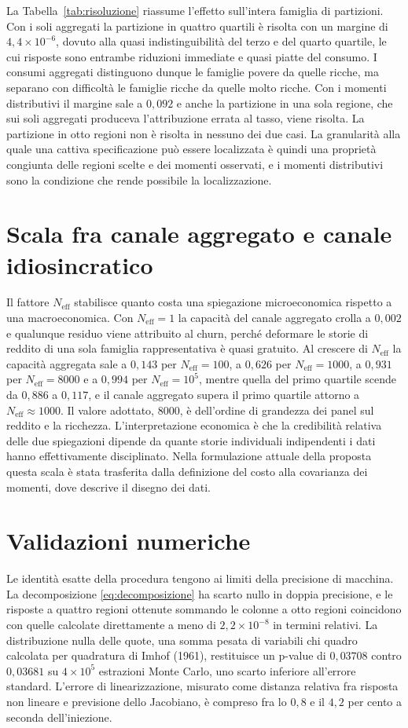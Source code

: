 \documentclass[11pt,a4paper]{article}
\newcommand{\Neff}{N_{\mathrm{eff}}}
\begin{document}
La Tabella~\ref{tab:risoluzione} riassume l'effetto sull'intera famiglia di partizioni. Con i soli aggregati la partizione in quattro quartili è risolta con un margine di $4{,}4\times10^{-6}$, dovuto alla quasi indistinguibilità del terzo e del quarto quartile, le cui risposte sono entrambe riduzioni immediate e quasi piatte del consumo. I consumi aggregati distinguono dunque le famiglie povere da quelle ricche, ma separano con difficoltà le famiglie ricche da quelle molto ricche. Con i momenti distributivi il margine sale a $0{,}092$ e anche la partizione in una sola regione, che sui soli aggregati produceva l'attribuzione errata al tasso, viene risolta. La partizione in otto regioni non è risolta in nessuno dei due casi. La granularità alla quale una cattiva specificazione può essere localizzata è quindi una proprietà congiunta delle regioni scelte e dei momenti osservati, e i momenti distributivi sono la condizione che rende possibile la localizzazione.

\section{Scala fra canale aggregato e canale idiosincratico}\label{sec:neff}
Il fattore $\Neff$ stabilisce quanto costa una spiegazione microeconomica rispetto a una macroeconomica. Con $\Neff=1$ la capacità del canale aggregato crolla a $0{,}002$ e qualunque residuo viene attribuito al churn, perché deformare le storie di reddito di una sola famiglia rappresentativa è quasi gratuito. Al crescere di $\Neff$ la capacità aggregata sale a $0{,}143$ per $\Neff=100$, a $0{,}626$ per $\Neff=1000$, a $0{,}931$ per $\Neff=8000$ e a $0{,}994$ per $\Neff=10^5$, mentre quella del primo quartile scende da $0{,}886$ a $0{,}117$, e il canale aggregato supera il primo quartile attorno a $\Neff\approx1000$. Il valore adottato, $8000$, è dell'ordine di grandezza dei panel sul reddito e la ricchezza. L'interpretazione economica è che la credibilità relativa delle due spiegazioni dipende da quante storie individuali indipendenti i dati hanno effettivamente disciplinato. Nella formulazione attuale della proposta questa scala è stata trasferita dalla definizione del costo alla covarianza dei momenti, dove descrive il disegno dei dati.

\section{Validazioni numeriche}\label{sec:validazioni}
Le identità esatte della procedura tengono ai limiti della precisione di macchina. La decomposizione \eqref{eq:decomposizione} ha scarto nullo in doppia precisione, e le risposte a quattro regioni ottenute sommando le colonne a otto regioni coincidono con quelle calcolate direttamente a meno di $2{,}2\times10^{-8}$ in termini relativi. La distribuzione nulla delle quote, una somma pesata di variabili chi quadro calcolata per quadratura di Imhof (1961), restituisce un p-value di $0{,}03708$ contro $0{,}03681$ su $4\times10^5$ estrazioni Monte Carlo, uno scarto inferiore all'errore standard. L'errore di linearizzazione, misurato come distanza relativa fra risposta non lineare e previsione dello Jacobiano, è compreso fra lo $0{,}8$ e il $4{,}2$ per cento a seconda dell'iniezione.
\end{document}
